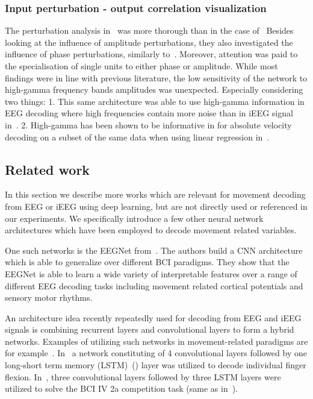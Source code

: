 \subsubsection{Input perturbation - output correlation visualization}
The perturbation analysis in~\cite{Hammer-2021} was more thorough than in the case of~\cite{schirrmeister-deep-2017}
Besides looking at the influence of amplitude perturbations, they also investigated the influence of phase perturbations, similarly to~\cite{hartmann-hierarchical-2018}.
Moreover, attention was paid to the specialisation of single units to either phase or amplitude.
While most findings were in line with previous literature, the low sensitivity of the network to high-gamma frequency bands amplitudes was unexpected.
Especially considering two things: 
1. This same architecture was able to use high-gamma information in EEG decoding where high frequencies contain more noise than in iEEG signal in~\cite{schirrmeister-deep-2017}.
2. High-gamma has been shown to be informative in for absolute velocity decoding on a subset of the same data when using linear regression in~\cite{hammer-predominance-2016}.


\subsection{Related work}
In this section we describe more works which are relevant for movement decoding from EEG or iEEG using deep learning, but are not directly used or referenced in our experiments.
We specifically introduce a few other neural network architectures which have been employed to decode movement related variables.

One such networks is the EEGNet from~\cite{lawhern-eegnet-2018}.
The authors build a CNN architecture which is able to generalize over different BCI paradigms.
They show that the EEGNet is able to learn a wide variety of interpretable features over a range of different EEG decoding tasks including movement related cortical potentials and sensory motor rhythms.

An architecture idea recently repeatedly used for decoding from EEG and iEEG signals is combining recurrent layers and convolutional layers to form a hybrid networks.
Examples of utilizing such networks in movement-related paradigms are for example~\cite{xie-cnn-lstm-finger-movement, Zhang-2019}.
In~\cite{xie-cnn-lstm-finger-movement} a network constituting of 4 convolutional layers followed by one long-short term memory (LSTM)~(\cite{lstm-paper}) layer was utilized to decode individual finger flexion.
In~\cite{Zhang-2019}, three convolutional layers followed by three LSTM layers were utilized to solve the BCI IV 2a competition task (same as in~\cite{schirrmeister-deep-2017}).


